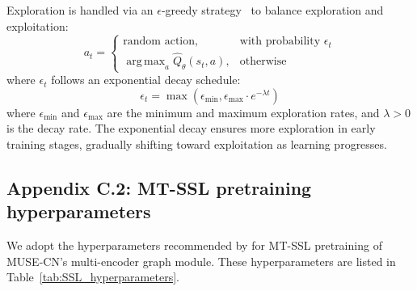 \documentclass{article}
\DeclareMathOperator*{\argmax}{arg\,max}
\begin{document}
Exploration is handled via an $\epsilon$-greedy strategy~\cite{sutton2018reinforcement} to balance exploration and exploitation:
\begin{equation}
    a_t = \begin{cases}
        \text{random action}, & \text{with probability } \epsilon_t \\
        \argmax_{a} \hat{Q}_{\theta}(s_t, a), & \text{otherwise}
    \end{cases}
\end{equation}
where $\epsilon_t$ follows an exponential decay schedule:
\begin{equation}
    \epsilon_t = \max(\epsilon_{\min}, \epsilon_{\max} \cdot e^{-\lambda t})
\end{equation}
where $\epsilon_{\min}$ and $\epsilon_{\max}$ are the minimum and maximum exploration rates, and $\lambda > 0$ is the decay rate. The exponential decay ensures more exploration in early training stages, gradually shifting toward exploitation as learning progresses.

\subsection{Appendix C.2: MT-SSL pretraining hyperparameters}
\label{app:pretraining_hyperparameters}



We adopt the hyperparameters recommended by \citet{khoshbakhtian2024mega} for MT-SSL pretraining of MUSE-CN's multi-encoder graph module. These hyperparameters are listed in Table~\ref{tab:SSL_hyperparameters}.
\end{document}
